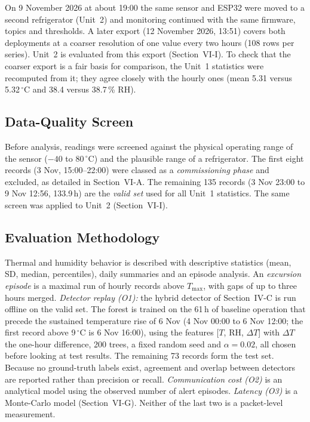 \documentclass[conference]{IEEEtran}
\newcommand{\degC}{\ensuremath{^{\circ}}C}
\newcommand{\Tmax}{\ensuremath{T_{\max}}}
\begin{document}
On 9 November 2026 at about 19:00 the same sensor and ESP32 were moved to a second refrigerator (Unit~2) and monitoring continued with the same firmware, topics and thresholds. A later export (12 November 2026, 13:51) covers both deployments at a coarser resolution of one value every two hours (108 rows per series). Unit~2 is evaluated from this export (Section~VI-I). To check that the coarser export is a fair basis for comparison, the Unit~1 statistics were recomputed from it; they agree closely with the hourly ones (mean 5.31 versus 5.32\,\degC{} and 38.4 versus 38.7\,\% RH).

\subsection{Data-Quality Screen}
Before analysis, readings were screened against the physical operating range of the sensor ($-40$ to 80\,\degC) and the plausible range of a refrigerator. The first eight records (3 Nov, 15:00--22:00) were classed as a \emph{commissioning phase} and excluded, as detailed in Section~VI-A. The remaining 135 records (3 Nov 23:00 to 9 Nov 12:56, 133.9\,h) are the \emph{valid set} used for all Unit~1 statistics. The same screen was applied to Unit~2 (Section~VI-I).

\subsection{Evaluation Methodology}
Thermal and humidity behavior is described with descriptive statistics (mean, SD, median, percentiles), daily summaries and an episode analysis. An \emph{excursion episode} is a maximal run of hourly records above \Tmax, with gaps of up to three hours merged. \emph{Detector replay (O1):} the hybrid detector of Section~IV-C is run offline on the valid set. The forest is trained on the 61\,h of baseline operation that precede the sustained temperature rise of 6 Nov (4 Nov 00:00 to 6 Nov 12:00; the first record above 9\,\degC{} is 6 Nov 16:00), using the features [$T$, RH, $\Delta T$] with $\Delta T$ the one-hour difference, 200 trees, a fixed random seed and $\alpha = 0.02$, all chosen before looking at test results. The remaining 73 records form the test set. Because no ground-truth labels exist, agreement and overlap between detectors are reported rather than precision or recall. \emph{Communication cost (O2)} is an analytical model using the observed number of alert episodes. \emph{Latency (O3)} is a Monte-Carlo model (Section~VI-G). Neither of the last two is a packet-level measurement.
\end{document}
